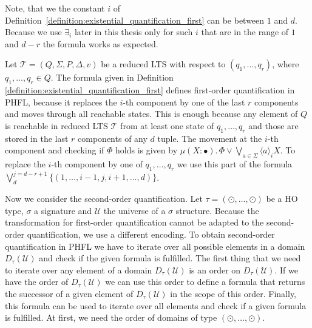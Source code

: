 Note, that we the constant $i$ of Definition~\ref{definition:existential_quantification_first} can be between $1$ and $d$. Because we use $\exists_i$ later in this thesis only for such $i$ that are in the range of $1$ and $d - r$ the formula works as expected.

\begin{observation}
\label{observation:existential_quantification_first}
		Let $\mathcal{T} = (Q, \Sigma, P, \Delta, v)$ be a reduced LTS with respect to $(q_1, \dots, q_r)$, where $q_1, \dots, q_r \in Q$. The formula given in Definition~
		\ref{definition:existential_quantification_first} defines first-order quantification in PHFL, because it replaces the $i$-th component by one of the last $r$ components and moves 
		through all reachable states. This is enough because any element of $Q$ is reachable in reduced LTS $\mathcal{T}$ from at least one state of 
        $q_1, \dots, q_r$ and those are stored in the last $r$ components of any $d$ tuple. The movement at the $i$-th component and checking if $\Phi$ 
        holds is given by $\mu (X \colon \bullet).\,\Phi \vee \bigvee_{a \in \Sigma} \langle a 
        \rangle_{i} X$. To replace the $i$-th component by one of $q_1, \dots, q_r$ 
        we use this part of the formula $\bigvee_{d}^{j=d-r+1} \{(1, \dots, i-1, j, i + 1, \dots, d)\}$.
\end{observation}

Now we consider the second-order quantification. Let $\tau = (\odot, \dots, \odot)$ be a HO type, $\sigma$ a signature and
$\mathcal{U}$ the universe of a $\sigma$ structure. Because the transformation for first-order quantification cannot be adapted to the second-order quantification, we use a different encoding. To obtain second-order
quantification in PHFL we have to iterate over all possible elements in a domain $D_\tau(\mathcal{U})$ and
check if the given formula is fulfilled. The first thing that we need to iterate over any element of a domain
$D_\tau(\mathcal{U})$ is an order on $D_\tau(\mathcal{U})$. If we have the order of $D_\tau(\mathcal{U})$ we can use
this order to define a formula that returns the successor of a given element of $D_\tau(\mathcal{U})$ in the scope
of this order. Finally, this formula can be used to iterate over all elements and check if a given formula is
fulfilled.
At first, we need the order of domains of type $(\odot, \dots, \odot)$.

